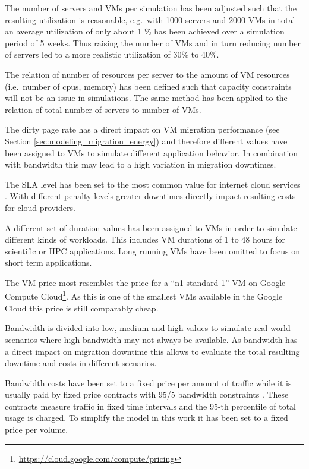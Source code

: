 The number of servers and VMs per simulation has been adjusted such that the resulting utilization is reasonable, e.g.~with 1000 servers and 2000 VMs in total an average utilization of only about 1 \% has been achieved over a simulation period of 5 weeks. Thus raising the number of VMs and in turn reducing number of servers led to a more realistic utilization of 30\% to 40\%. 

The relation of number of resources per server to the amount of VM resources (i.e.~number of cpus, memory) has been defined such that capacity constraints will not be an issue in simulations. The same method has been applied to the relation of total number of servers to number of VMs. 

The dirty page rate has a direct impact on VM migration performance (see Section \ref{sec:modeling_migration_energy}) and therefore different values have been assigned to VMs to simulate different application behavior. In combination with bandwidth this may lead to a high variation in migration downtimes. 

The SLA level has been set to the most common value for internet cloud services \cite{google2015compute,amazon2013sla}. With different penalty levels greater downtimes directly impact resulting costs for cloud providers. 

A different set of duration values has been assigned to VMs in order to simulate different kinds of workloads. This includes VM durations of 1 to 48 hours for scientific or HPC applications. Long running VMs have been omitted to focus on short term applications. 

The VM price most resembles the price for a ``n1-standard-1'' VM on Google Compute Cloud\footnote{\url{https://cloud.google.com/compute/pricing}}. As this is one of the smallest VMs available in the Google Cloud this price is still comparably cheap. 

Bandwidth is divided into low, medium and high values to simulate real world scenarios where high bandwidth may not always be available. As bandwidth has a direct impact on migration downtime this allows to evaluate the total resulting downtime and costs in different scenarios. 

Bandwidth costs have been set to a fixed price per amount of traffic while it is usually paid by fixed price contracts with 95/5 bandwidth constraints \cite{qureshi2009cutting}. These contracts measure traffic in fixed time intervals and the 95-th percentile of total usage is charged. To simplify the model in this work it has been set to a fixed price per volume. 

